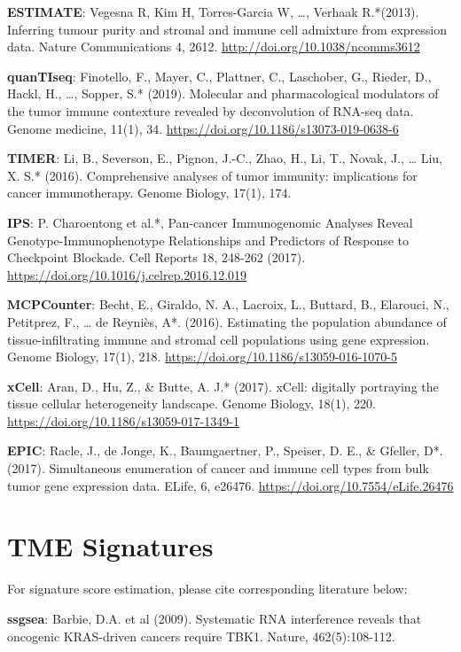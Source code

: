 \documentclass[
  12pt,
]{book}
\begin{document}
\textbf{ESTIMATE}: Vegesna R, Kim H, Torres-Garcia W, \ldots, Verhaak R.*(2013). Inferring tumour purity and stromal and immune cell admixture from expression data. Nature Communications 4, 2612. \url{http://doi.org/10.1038/ncomms3612}

\textbf{quanTIseq}: Finotello, F., Mayer, C., Plattner, C., Laschober, G., Rieder, D., Hackl, H., \ldots, Sopper, S.* (2019). Molecular and pharmacological modulators of the tumor immune contexture revealed by deconvolution of RNA-seq data. Genome medicine, 11(1), 34. \url{https://doi.org/10.1186/s13073-019-0638-6}

\textbf{TIMER}: Li, B., Severson, E., Pignon, J.-C., Zhao, H., Li, T., Novak, J., \ldots{} Liu, X. S.* (2016). Comprehensive analyses of tumor immunity: implications for cancer immunotherapy. Genome Biology, 17(1), 174.

\textbf{IPS}: P. Charoentong et al.*, Pan-cancer Immunogenomic Analyses Reveal Genotype-Immunophenotype Relationships and Predictors of Response to Checkpoint Blockade. Cell Reports 18, 248-262 (2017). \url{https://doi.org/10.1016/j.celrep.2016.12.019}

\textbf{MCPCounter}: Becht, E., Giraldo, N. A., Lacroix, L., Buttard, B., Elarouci, N., Petitprez, F., \ldots{} de Reyniès, A*. (2016). Estimating the population abundance of tissue-infiltrating immune and stromal cell populations using gene expression. Genome Biology, 17(1), 218. \url{https://doi.org/10.1186/s13059-016-1070-5}

\textbf{xCell}: Aran, D., Hu, Z., \& Butte, A. J.* (2017). xCell: digitally portraying the tissue cellular heterogeneity landscape. Genome Biology, 18(1), 220. \url{https://doi.org/10.1186/s13059-017-1349-1}

\textbf{EPIC}: Racle, J., de Jonge, K., Baumgaertner, P., Speiser, D. E., \& Gfeller, D*. (2017). Simultaneous enumeration of cancer and immune cell types from bulk tumor gene expression data. ELife, 6, e26476. \url{https://doi.org/10.7554/eLife.26476}

\hypertarget{tme-signatures}{%
\section{TME Signatures}\label{tme-signatures}}

For signature score estimation, please cite corresponding literature below:

\textbf{ssgsea}: Barbie, D.A. et al (2009). Systematic RNA interference reveals that oncogenic KRAS-driven cancers require TBK1. Nature, 462(5):108-112.
\end{document}

